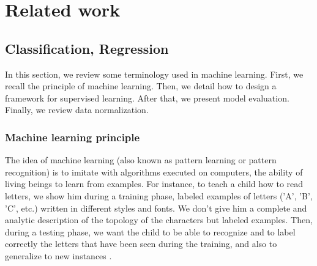 \chapter{Related work}
\label{chap:premierchapitre}
\minitoc





\section{Classification, Regression}

In this section, we review some terminology used in machine learning. First, we recall the principle of machine learning. Then, we detail how to design a framework for supervised learning. After that, we present model evaluation. Finally, we review data normalization. 

\subsection{Machine learning principle}
The idea of machine learning (also known as pattern learning or pattern recognition) is to imitate with algorithms executed on computers, the ability of living beings to learn from examples. For instance, to teach a child how to read letters, we show him during a training phase, labeled examples of letters ('A', 'B', 'C', etc.) written in different styles and fonts. We don't give him a complete and analytic description of the topology of the characters but labeled examples. Then, during a testing phase, we want the child to be able to recognize and to label correctly the letters that have been seen during the training, and also to generalize to new instances \cite{Dreyfus2006}. 


